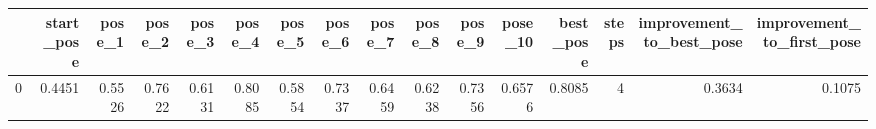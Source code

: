 \begin{tabular}{lrrrrrrrrrrrrrrr}
\toprule
{} &  start\_pose &  pose\_1 &  pose\_2 &  pose\_3 &  pose\_4 &  pose\_5 &  pose\_6 &  pose\_7 &  pose\_8 &  pose\_9 &  pose\_10 &  best\_pose &  steps &  improvement\_to\_best\_pose &  improvement\_to\_first\_pose \\
\midrule
0 &      0.4451 &  0.5526 &  0.7622 &  0.6131 &  0.8085 &  0.5854 &  0.7337 &  0.6459 &  0.6238 &  0.7356 &   0.6576 &     0.8085 &      4 &                    0.3634 &                     0.1075 \\
\bottomrule
\end{tabular}
